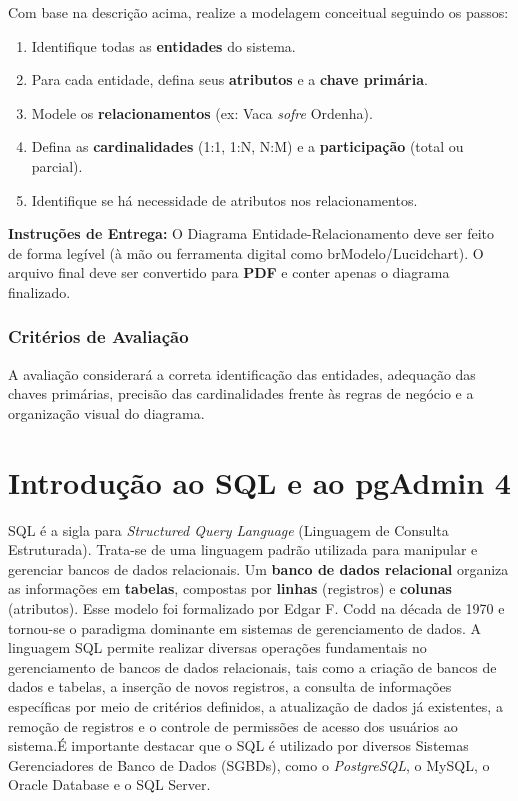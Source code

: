 \documentclass[12pt,a4paper,openright]{book}
\begin{document}
Com base na descrição acima, realize a modelagem conceitual seguindo os passos:
\begin{enumerate}
    \item Identifique todas as \textbf{entidades} do sistema.
    \item Para cada entidade, defina seus \textbf{atributos} e a \textbf{chave primária}.
    \item Modele os \textbf{relacionamentos} (ex: Vaca \textit{sofre} Ordenha).
    \item Defina as \textbf{cardinalidades} (1:1, 1:N, N:M) e a \textbf{participação} (total ou parcial).
    \item Identifique se há necessidade de atributos nos relacionamentos.
\end{enumerate}

\begin{observacao}
\textbf{Instruções de Entrega:}
O Diagrama Entidade-Relacionamento deve ser feito de forma legível (à mão ou ferramenta digital como brModelo/Lucidchart). O arquivo final deve ser convertido para \textbf{PDF} e conter apenas o diagrama finalizado.
\end{observacao}

\subsection{Critérios de Avaliação}
A avaliação considerará a correta identificação das entidades, adequação das chaves primárias, precisão das cardinalidades frente às regras de negócio e a organização visual do diagrama.

\vspace{0.5cm}

\chapter{Introdução ao SQL e ao pgAdmin 4}

SQL é a sigla para \textit{Structured Query Language} (Linguagem de Consulta Estruturada). Trata-se de uma linguagem padrão utilizada para manipular e gerenciar bancos de dados relacionais. Um \textbf{banco de dados relacional} organiza as informações em \textbf{tabelas}, compostas por \textbf{linhas} (registros) e \textbf{colunas} (atributos). Esse modelo foi formalizado por Edgar F. Codd na década de 1970 e tornou-se o paradigma dominante em sistemas de gerenciamento de dados. A linguagem SQL permite realizar diversas operações fundamentais no gerenciamento de bancos de dados relacionais, tais como a criação de bancos de dados e tabelas, a inserção de novos registros, a consulta de informações específicas por meio de critérios definidos, a atualização de dados já existentes, a remoção de registros e o controle de permissões de acesso dos usuários ao sistema.É importante destacar que o SQL é utilizado por diversos Sistemas Gerenciadores de Banco de Dados (SGBDs), como o \textit{PostgreSQL}, o MySQL, o Oracle Database e o SQL Server.
\end{document}

